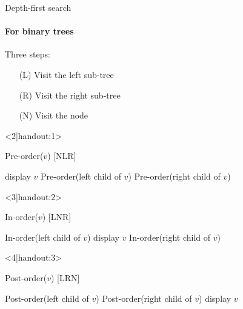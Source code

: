 \documentclass{beamer}
\begin{document}
\begin{frame}[fragile]{Depth-first search}
  \framesubtitle{For binary trees}
  
  \begin{overlayarea}{\textwidth}{\textheight}
  \begin{block}{}
    Three steps:
    \begin{itemize}
      \item[(L)] Visit the left sub-tree
      \item[(R)] Visit the right sub-tree
      \item[(N)] Visit the node
    \end{itemize}
  \end{block}
  
  \begin{onlyenv}<2|handout:1>
  \begin{code}{Pre-order($v$) [NLR]}
    \begin{PseudoCode}
display $v$
Pre-order(left child of $v$)
Pre-order(right child of $v$)
    \end{PseudoCode}
  \end{code}
  \end{onlyenv}
  
  \begin{onlyenv}<3|handout:2>
  \begin{code}{In-order($v$) [LNR]}
    \begin{PseudoCode}
In-order(left child of $v$)
display $v$
In-order(right child of $v$)
    \end{PseudoCode}
  \end{code}  
  \end{onlyenv}
  
  \begin{onlyenv}<4|handout:3>
  \begin{code}{Post-order($v$)  [LRN]}
    \begin{PseudoCode}
Post-order(left child of $v$)
Post-order(right child of $v$)
display $v$
    \end{PseudoCode}
  \end{code}  
  \end{onlyenv}
   \end{overlayarea}
\end{frame}
\end{document}
